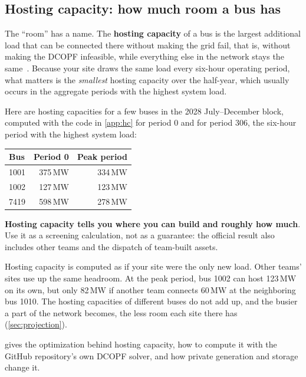 \documentclass[10pt]{article}
\newcommand{\MW}{\ensuremath{\,\mathrm{MW}}}
\begin{document}
\subsection{Hosting capacity: how much room a bus has}\label{sec:hc}
The ``room'' has a name. The \textbf{hosting capacity} of a bus
is the largest additional load that can be connected there without making the
grid fail, that is, without making the DCOPF infeasible, while everything else
in the network stays the same~\cite{bollen2011integration,wan2026hosting}.
Because your site draws the same load every six-hour operating period, what matters is the
\emph{smallest} hosting capacity over the half-year, which usually occurs in the
aggregate periods with the highest system load.

Here are hosting capacities for a few buses in the 2028 July--December block,
computed with the code in \cref{app:hc} for period 0 and for period 306, the
six-hour period with the highest system load:

\begin{center}
\small
\begin{tabular}{@{}l r r@{}}
\toprule
Bus & Period 0 & Peak period\\
\midrule
1001 & 375\MW & 334\MW\\
1002 & 127\MW & 123\MW\\
7419 & 598\MW & 278\MW\\
\bottomrule
\end{tabular}
\end{center}

\textbf{Hosting capacity tells you where you can build and roughly how much}.
Use it as a screening calculation, not as a guarantee: the official result
also includes other teams and the dispatch of team-built assets.

\begin{warningbox}
Hosting capacity is computed as if your site were the only new load. Other
teams' sites use up the same headroom. At the peak period, bus 1002 can host
123\MW{} on its own, but only 82\MW{} if another team connects 60\MW{} at the
neighboring bus 1010. The hosting capacities of different buses do not add up,
and the busier a part of the network becomes, the less room each site there
has (\cref{sec:projection}).
\end{warningbox}

 gives the optimization behind hosting capacity, how to compute
it with the GitHub repository's own DCOPF solver, and how private generation and
storage change it.
\end{document}
